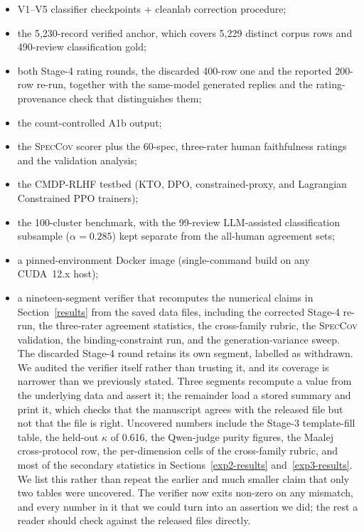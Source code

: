 \documentclass[preprint,12pt]{elsarticle}
\begin{document}
\begin{itemize}\setlength{\itemsep}{1pt}
\item V1--V5 classifier checkpoints + cleanlab correction procedure;
\item the 5{,}230-record verified anchor, which covers 5{,}229 distinct corpus rows and 490-review classification gold;
\item both Stage-4 rating rounds, the discarded 400-row one and the reported 200-row re-run, together with the same-model generated replies and the rating-provenance check that distinguishes them;
\item the count-controlled A1b output;
\item the \textsc{SpecCov} scorer plus the 60-spec, three-rater human faithfulness ratings and the validation analysis;
\item the CMDP-RLHF testbed (KTO, DPO, constrained-proxy, and Lagrangian Constrained PPO trainers);
\item the 100-cluster benchmark, with the 99-review LLM-assisted classification subsample ($\alpha = 0.285$) kept separate from the all-human agreement sets;
\item a pinned-environment Docker image (single-command build on any CUDA~12.x host);
\item a nineteen-segment verifier that recomputes the numerical claims in Section~\ref{results}
from the saved data files, including the corrected Stage-4 re-run, the three-rater agreement
statistics, the cross-family rubric, the \textsc{SpecCov} validation, the binding-constraint run,
and the generation-variance sweep. The discarded Stage-4 round retains its own segment, labelled
as withdrawn. We audited the verifier itself rather than trusting it, and its coverage is
narrower than we previously stated. Three segments recompute a value from the underlying data and
assert it; the remainder load a stored summary and print it, which checks that the manuscript
agrees with the released file but not that the file is right. Uncovered numbers include the
Stage-3 template-fill table, the held-out $\kappa$ of 0.616, the Qwen-judge purity figures, the
Maalej cross-protocol row, the per-dimension cells of the cross-family rubric, and most of the
secondary statistics in Sections~\ref{exp2-results} and~\ref{exp3-results}. We list this rather
than repeat the earlier and much smaller claim that only two tables were uncovered. The verifier
now exits non-zero on any mismatch, and every number in it that we could turn into an assertion
we did; the rest a reader should check against the released files directly.
\end{itemize}
\end{document}
